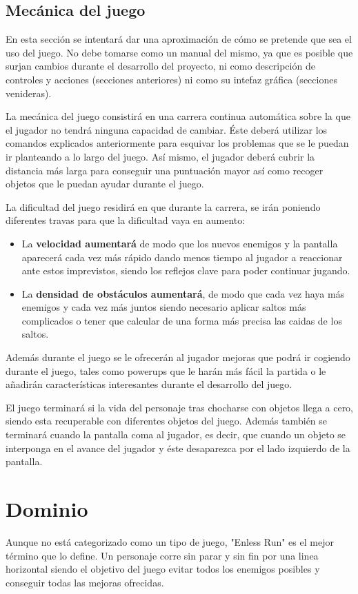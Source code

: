 \documentclass[palatino]{apuntes}
\begin{document}
\subsection{Mecánica del juego}
En esta sección se intentará dar una aproximación de cómo se pretende que sea el uso del juego. No debe tomarse como un manual del mismo, ya que es posible que surjan cambios durante el desarrollo del proyecto, ni como descripción de controles y acciones (secciones anteriores) ni como su intefaz gráfica (secciones venideras).

La mecánica del juego consistirá en una carrera continua automática sobre la que el jugador no tendrá ninguna capacidad de cambiar. Éste deberá utilizar los comandos explicados anteriormente para esquivar los problemas que se le puedan ir planteando a lo largo del juego. Así mismo, el jugador deberá cubrir la distancia más larga para conseguir una puntuación mayor así como recoger objetos que le puedan ayudar durante el juego.

La dificultad del juego residirá en que durante la carrera, se irán poniendo diferentes travas para que la dificultad vaya en aumento:

\begin{itemize}
    \item La \textbf{velocidad aumentará} de modo que los nuevos enemigos y la pantalla aparecerá cada vez más rápido dando menos tiempo al jugador a reaccionar ante estos imprevistos, siendo los reflejos clave para poder continuar jugando.
    \item La \textbf{densidad de obstáculos aumentará}, de modo que cada vez haya más enemigos y cada vez más juntos siendo necesario aplicar saltos más complicados o tener que calcular de una forma más precisa las caidas de los saltos.
\end{itemize}

Además durante el juego se le ofrecerán al jugador mejoras que podrá ir cogiendo durante el juego, tales como powerups que le harán más fácil la partida o le añadirán características interesantes durante el desarrollo del juego.

El juego terminará si la vida del personaje tras chocharse con objetos llega a cero, siendo esta recuperable con diferentes objetos del juego. Además también se terminará cuando la pantalla coma al jugador, es decir, que cuando un objeto se interponga en el avance del jugador y éste desaparezca por el lado izquierdo de la pantalla.


\section{Dominio}
Aunque no está categorizado como un tipo de juego, "Enless Run" es el mejor término que lo define. Un personaje corre sin parar y sin fin por una linea horizontal siendo el objetivo del juego evitar todos los enemigos posibles y conseguir todas las mejoras ofrecidas.
\end{document}
